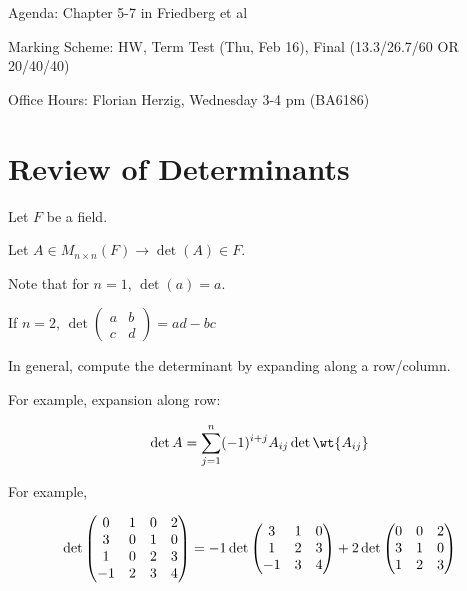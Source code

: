 \documentclass[11pt]{scrartcl}
\begin{document}
Agenda: Chapter 5-7 in Friedberg et al

Marking Scheme: HW, Term Test (Thu, Feb 16), Final (13.3/26.7/60 OR
20/40/40)

Office Hours: Florian Herzig, Wednesday 3-4 pm (BA6186)
\section{Review of Determinants}
\label{sec:det}
Let \(F\) be a field.

Let \(A\in M_{n\times n}(F) \to \det(A) \in F \).

Note that for \(n=1\), \(\det(a) = a\).

If \(n=2\), \(\det \begin{pmatrix}
                     a & b\\
                     c & d
                   \end{pmatrix} = ad-bc
                   \)

In general, compute the determinant by expanding along a row/column.

For example, expansion along row:

\[
  \det A = \sum_{j=1} ^{n} (-1)^{i+j}A_{ij} \det \wt{A_{ij}}
\]

For example,

\[
  \det \begin{pmatrix}
    0 & 1 & 0 & 2\\
    3 & 0 & 1 & 0\\
    1 & 0 & 2 & 3\\
    -1 & 2 & 3 & 4

  \end{pmatrix} = -1 \* \det
  \begin{pmatrix}
    3 & 1 & 0\\
    1 & 2 & 3\\
    -1 & 3 &4
  \end{pmatrix}
  + 2 \det
  \begin{pmatrix}
    0 & 0 & 2\\
    3 & 1 & 0\\
    1 & 2 & 3
  \end{pmatrix}
\]
\end{document}
